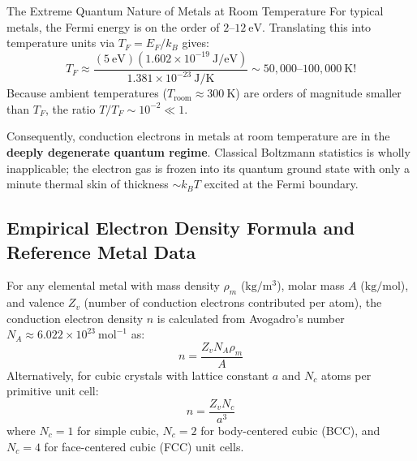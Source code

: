 \documentclass[11pt,a4paper]{article}
\begin{document}
\begin{takeawaybox}{The Extreme Quantum Nature of Metals at Room Temperature}
For typical metals, the Fermi energy is on the order of $2\text{--}12\ \mathrm{eV}$. Translating this into temperature units via $T_F = E_F/k_B$ gives:
\[
T_F \approx \frac{(5\ \mathrm{eV})(1.602 \times 10^{-19}\ \mathrm{J/eV})}{1.381 \times 10^{-23}\ \mathrm{J/K}} \sim 50{,}000\text{--}100{,}000\ \mathrm{K}!
\]
Because ambient temperatures ($T_{\mathrm{room}} \approx 300\ \mathrm{K}$) are orders of magnitude smaller than $T_F$, the ratio $T/T_F \sim 10^{-2} \ll 1$. 

Consequently, conduction electrons in metals at room temperature are in the \textbf{deeply degenerate quantum regime}. Classical Boltzmann statistics is wholly inapplicable; the electron gas is frozen into its quantum ground state with only a minute thermal skin of thickness $\sim k_B T$ excited at the Fermi boundary.
\end{takeawaybox}

\subsection{Empirical Electron Density Formula and Reference Metal Data}
For any elemental metal with mass density $\rho_m$ ($\mathrm{kg/m^3}$), molar mass $A$ ($\mathrm{kg/mol}$), and valence $Z_v$ (number of conduction electrons contributed per atom), the conduction electron density $n$ is calculated from Avogadro's number $N_A \approx 6.022 \times 10^{23}\ \mathrm{mol}^{-1}$ as:
\begin{equation}
\boxed{n = \frac{Z_v N_A \rho_m}{A}}
\label{eq:empirical_n_formula}
\end{equation}
Alternatively, for cubic crystals with lattice constant $a$ and $N_c$ atoms per primitive unit cell:
\begin{equation}
n = \frac{Z_v N_c}{a^3}
\label{eq:lattice_n_formula}
\end{equation}
where $N_c = 1$ for simple cubic, $N_c = 2$ for body-centered cubic (BCC), and $N_c = 4$ for face-centered cubic (FCC) unit cells.
\end{document}
